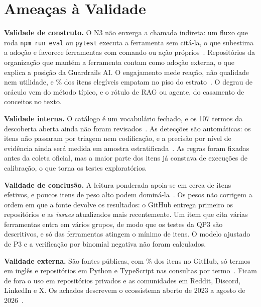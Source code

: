 \documentclass[sigconf]{acmart}
\newif\ifcomstatsmodels
\newcommand{\DescCandidatos}{107}        %
\begin{document}
\section{Ameaças à Validade}
\label{sec:ameacas}

\textbf{Validade de construto.} O N3 não enxerga a chamada indireta: um fluxo que roda \texttt{npm run eval} ou \texttt{pytest} executa a ferramenta sem citá-la, o que subestima a adoção e favorece ferramentas com comando ou ação próprios~\cite{kalliamvakou2014promises}. Repositórios da organização que mantém a ferramenta contam como adoção externa, o que explica a posição da Guardrails AI. O engajamento mede reação, não qualidade nem utilidade, e \ResEngPctPiso\% dos itens elegíveis empatam no piso do estrato~\cite{borges2018star}. O degrau de oráculo vem do método típico, e o rótulo de RAG ou agente, do casamento de conceitos no texto.

\textbf{Validade interna.} O catálogo é um vocabulário fechado, e os \DescCandidatos{} termos da descoberta aberta ainda não foram revisados~\cite{blei2003lda}. As detecções são automáticas: os itens não passaram por triagem nem codificação, e a precisão por nível de evidência ainda será medida em amostra estratificada~\cite{msrkit2027}. As regras foram fixadas antes da coleta oficial, mas a maior parte dos itens já constava de execuções de calibração, o que torna os testes exploratórios.

\textbf{Validade de conclusão.} A leitura ponderada apoia-se em cerca de \ResNEfetivo{} itens efetivos, e poucos itens de peso alto podem dominá-la~\cite{kish1965survey}. Os pesos não corrigem a ordem em que a fonte devolve os resultados: o GitHub entrega primeiro os repositórios e as \textit{issues} atualizados mais recentemente. Um item que cita várias ferramentas entra em vários grupos, de modo que os testes da QP3 são descritivos, e só \ResEngFerramentas{} das \ResFerramentasTeste{} ferramentas atingem o mínimo de itens.\ifcomstatsmodels\else{} O modelo ajustado de P3 e a verificação por binomial negativa não foram calculados.\fi

\textbf{Validade externa.} São \ResFontes{} fontes públicas, com \ResPctGithub\% dos itens no GitHub, só termos em inglês e repositórios em Python e TypeScript nas consultas por termo~\cite{garousi2019guidelines}. Ficam de fora o uso em repositórios privados e as comunidades em Reddit, Discord, LinkedIn e X. Os achados descrevem o ecossistema aberto de 2023 a agosto de 2026~\cite{ralph2020standards}.
\end{document}
